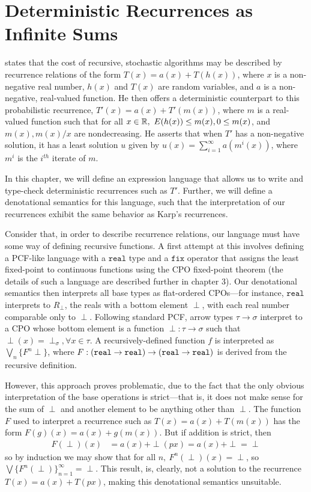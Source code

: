 \chapter{Deterministic Recurrences as Infinite Sums}
\cite[\S1]{Karp} states that the  cost of recursive, stochastic algorithms may 
be described by recurrence relations of the form $T(x) = a(x) + T(h(x))$, where $x$ is a non-negative real number, $h(x)$ 
and $T(x)$ are 
random variables, and $a$ is a non-negative, real-valued function. He then offers a deterministic counterpart to this
probabilistic recurrence, $T'(x) = a(x) + T'(m(x))$, where $m$ is a real-valued function such that for all
$ x \in \mathbb{R}, \ E(h(x)) \leq m(x) , 0 \leq m(x)$, and $m(x), m(x)/x$ are nondecreasing. He asserts that when $T'$ has a
non-negative solution, it has a least solution $u$ given by $u(x) = \sum_{i=1}^{\infty}a(m^i(x))$, where 
$m^i$ is the $i^{th}$ iterate of $m$. 

In this chapter, we will define an expression language that allows us to write and type-check
deterministic recurrences such as $T'$. Further, we will define a denotational semantics for this language, 
such that the interpretation of our recurrences exhibit the same behavior as Karp's recurrences. 

Consider that, in order to describe recurrence relations, our language must have some way of defining recursive functions.
A first attempt at this involves defining a PCF-like language with a $\texttt{real}$ type and a $\texttt{fix}$ operator
that assigns the least fixed-point to continuous functions using the CPO fixed-point theorem
(the details of such a language are described further in chapter 3). Our denotational semantics 
then interprets all base types as flat-ordered CPOs---for instance, $\texttt{real}$  interprets to $R_{\perp}$, the reals with a 
bottom element $\perp$, with each real number comparable only to $\perp$. Following standard PCF, arrow types
$\tau \rightarrow \sigma$ interpret to a CPO whose bottom element is a function $\perp: \tau \rightarrow \sigma$ such
that $\perp(x) = \perp_{\sigma}, \forall x \in \tau$. A recursively-defined function $f$ is interpreted as 
$\bigvee_n\{F^n \perp\}$, where $F: (\texttt{real} \rightarrow \texttt{real}) \rightarrow (\texttt{real} \rightarrow \texttt{real})$ is derived from
the recursive definition.

However, this approach proves problematic, due to the fact that the only obvious interpretation of the base operations is strict---that is, it does not make sense for the 
sum of $\perp$ and another element to be anything other than $\perp$. The function $F$ used to interpret a recurrence
such as $T(x) = a(x) + T(m(x))$ has the form $F(g)(x) = a(x) + g(m(x))$. But if addition is strict, then 
\begin{align*}
F(\perp)(x) &= a(x) + \perp(px) = a(x) + \perp = \perp 
\end{align*}
so by induction we may show that for all $n, \ F^n(\perp)(x) = \perp$, so $\bigvee\{F^n(\perp)\}^{\infty}_{n=1}  = \perp$. 
This result, is, clearly, not a solution to the recurrence $T(x) = a(x) + T(px)$, making this denotational semantics
unsuitable. 


